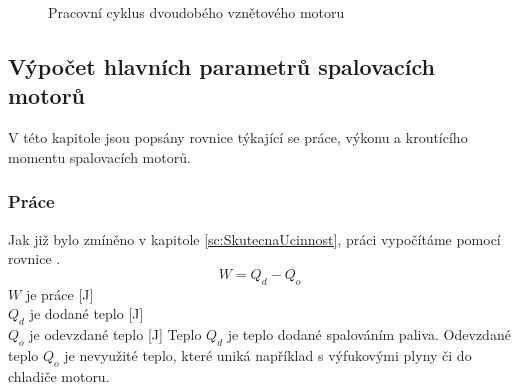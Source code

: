 \begin{figure}[H]
    
    \caption{Pracovní cyklus dvoudobého vznětového motoru \jaDiag}
    \label{obr:PracovniCyklusDvoudobehoVznetovehoMotoru}
\end{figure}

\newpage

\subsection{Výpočet hlavních parametrů spalovacích motorů}
{V této kapitole jsou popsány rovnice týkající se práce, výkonu a kroutícího momentu spalovacích motorů.}
\subsubsection{Práce}
{Jak již bylo zmíněno v kapitole \ref{sc:SkutecnaUcinnost}, práci vypočítáme pomocí rovnice .}
\cite{NCEPU:ThermalEfficiencyForHeatEngines}
\begin{equation}\label{rv:prace2}
    W=Q_d-Q_o
\end{equation}
{\(W\) je práce [J]}\\
{\(Q_d\) je dodané teplo [J]}\\
{\(Q_o\) je odevzdané teplo  [J]}\odst
{Teplo \(Q_d\) je teplo dodané spalováním paliva. Odevzdané teplo \(Q_o\) je nevyužité teplo, které uniká například s výfukovými plyny či do chladiče motoru.}
